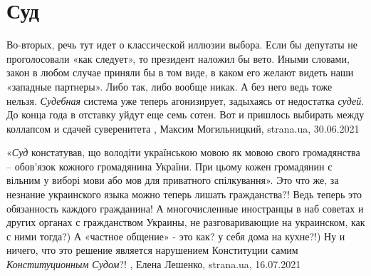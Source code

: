  
 
 
 
 
\chapter{Суд}
\label{sec:slova.sud}

Во-вторых, речь тут идет о классической иллюзии выбора. Если бы депутаты не
проголосовали «как следует», то президент наложил бы вето. Иными словами, закон
в любом случае приняли бы в том виде, в каком его желают видеть наши «западные
партнеры». Либо так, либо вообще никак.  А без него ведь тоже нельзя. \emph{Судебная}
система уже теперь агонизирует, задыхаясь от недостатка \emph{судей}. До конца года в
отставку уйдут еще семь сотен. Вот и пришлось выбирать между коллапсом и сдачей
суверенитета
, 
Максим Могильницкий, strana.ua, 30.06.2021

«\emph{Суд} констатував, що володіти українською мовою як мовою свого громадянства –
обов’язок кожного громадянина України. При цьому кожен громадянин є вільним у
виборі мови або мов для приватного спілкування».
Это что же, за незнание украинского языка можно теперь лишать гражданства?!
Ведь теперь это обязанность каждого гражданина!
А многочисленные иностранцы в наб советах и других органах с гражданством
Украины, не разговаривающие на украинском, как с ними тогда?)
А «частное общение» - это как? у себя дома на кухне?!)
Ну и ничего, что это решение является нарушением Конституции самим
\emph{Конституционным Судом}?!
, 
Елена Лешенко, strana.ua, 16.07.2021

